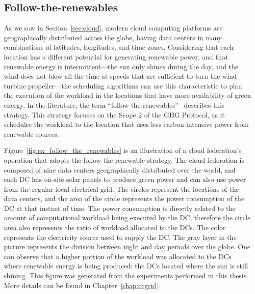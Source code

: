 \subsection{Follow-the-renewables}

\label{sec:followtherenewables}

As we saw in Section~\ref{sec:cloud}, modern cloud computing platforms are geographically distributed across the globe, having data centers in many combinations of latitudes, longitudes, and time zones. Considering that each location has a different potential for generating renewable power, and that renewable energy is intermittent---the sun only shines during the day, and the wind does not blow all the time at speeds that are sufficient to turn the wind turbine propeller---the scheduling algorithms can use this characteristic to plan the execution of the workload in the locations that have more availability of green energy. In the literature, the term ``follow-the-renewables''~\cite{shuja2016sustainable} describes this strategy. This strategy focuses on the Scope 2 of the GHG Protocol, as it schedules the workload to the location that uses less carbon-intensive power from renewable sources.

Figure~\ref{fig:ex_follow_the_renewables} is an illustration of a cloud federation's operation that adopts the follow-the-renewable strategy. The cloud federation is composed of nine data centers geographically distributed over the world, and each DC has on-site solar panels to produce green power and can also use power from the regular local electrical grid. The circles represent the locations of the data centers, and the area of the circle represents the power consumption of the DC at that instant of time. The power consumption is directly related to the amount of computational workload being executed by the DC, therefore the circle area also represents the ratio of workload allocated to the DCs. The color represents the electricity source used to supply the DC. The gray layer in the picture represents the division between night and day periods over the globe. One can observe that a higher portion of the workload was allocated to the DCs where renewable energy is being produced: the DCs located where the sun is still shining. This figure was generated from the experiments performed in this thesis. More details can be found in Chapter~\ref{chap:ccgrid}.

